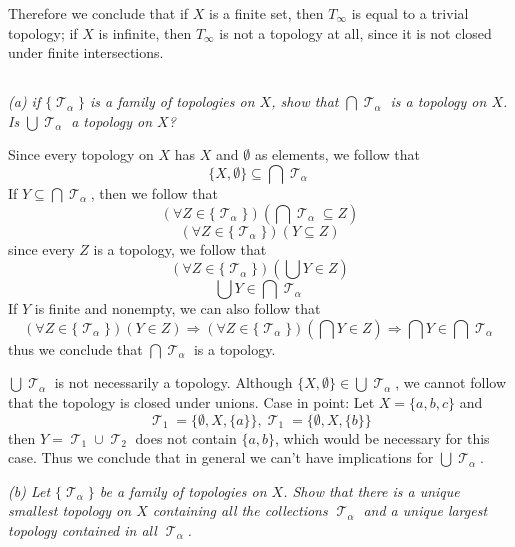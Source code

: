 \documentclass[11pt,oneside,titlepage]{book}
\DeclareMathOperator \topol {\mathcal {T}}
\DeclareMathOperator \ra {\Rightarrow}
\newcommand{\set}[1]{\{ #1 \}}
\begin{document}
Therefore we conclude that if $X$ is a finite set, then $T_\infty$ is equal to a
trivial topology; if $X$ is infinite, then $T_\infty$ is not a topology at all, since
it is not closed under finite intersections.

\subsection{}

\textit{(a) if $\{\topol_\alpha\}$ is a family of topologies on $X$, show that
  $\bigcap{\topol_\alpha}$ is a topology on $X$. Is $\bigcup{\topol_\alpha}$ a topology on $X$?}

Since every topology on $X$ has $X$ and $\emptyset$ as elements, we follow that
$$\{X, \emptyset\} \subseteq \bigcap{\topol_\alpha}$$
If $Y \subseteq \bigcap{\topol_\alpha}$, then we follow that
$$(\forall Z \in \{\topol_\alpha\})(\bigcap{\topol_\alpha} \subseteq Z)$$
$$(\forall Z \in \{\topol_\alpha\})(Y \subseteq Z)$$
since every $Z$ is a topology, we follow that
$$(\forall Z \in \{\topol_\alpha\})(\bigcup{Y} \in Z)$$
$$\bigcup{Y} \in \bigcap{\topol_\alpha}$$
If $Y$ is finite and nonempty, we can also follow that
$$(\forall Z \in \{\topol_\alpha\})(Y \in Z) \ra
(\forall Z \in \{\topol_\alpha\})(\bigcap{Y} \in Z) \ra \bigcap{Y} \in \bigcap{\topol_\alpha}$$
thus we conclude that $\bigcap{\topol_\alpha}$ is a topology.

$\bigcup{\topol_\alpha}$ is not necessarily a topology. Although
$\set{X, \emptyset} \in \bigcup{\topol_\alpha}$, we cannot follow that the topology is
closed under unions. Case in point: Let $X = \set{a, b, c}$ and
$$\topol_1 = \set{\emptyset, X, \set{a}}, \topol_1 = \set{\emptyset, X, \set{b}}$$
then $Y = \topol_1 \cup \topol_2$ does not contain $\set{a, b}$, which would be necessary
for this case. Thus we conclude that in general we can't have implications for
$\bigcup{\topol_\alpha}$.

\textit{(b) Let $\set{\topol_\alpha}$ be a family of topologies on $X$. Show that there is a
  unique smallest topology on $X$ containing all the collections $\topol_\alpha$ and
  a unique largest topology contained in all $\topol_\alpha$.}
\end{document}
